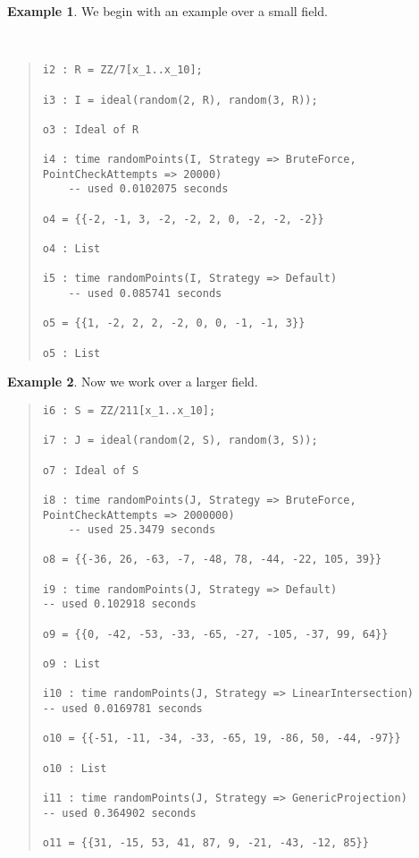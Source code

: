 \documentclass[11pt]{amsart}
\theoremstyle{definition}
\newtheorem{example}{Example}[section]
\begin{document}
    \begin{example}
        We begin with an example over a small field.
    {{\small\color{blue}
    ~~
    \begin{quote}
\begin{verbatim}
i2 : R = ZZ/7[x_1..x_10];

i3 : I = ideal(random(2, R), random(3, R));

o3 : Ideal of R

i4 : time randomPoints(I, Strategy => BruteForce, PointCheckAttempts => 20000)
    -- used 0.0102075 seconds

o4 = {{-2, -1, 3, -2, -2, 2, 0, -2, -2, -2}}

o4 : List

i5 : time randomPoints(I, Strategy => Default)
    -- used 0.085741 seconds

o5 = {{1, -2, 2, 2, -2, 0, 0, -1, -1, 3}}

o5 : List
    \end{verbatim}
\end{quote}\vspace{-1em}
    }}
    \end{example}    

\begin{example}
    Now we work over a larger field.
    {{\small\color{blue}
    \begin{quote}
\begin{verbatim}
i6 : S = ZZ/211[x_1..x_10];

i7 : J = ideal(random(2, S), random(3, S));

o7 : Ideal of S

i8 : time randomPoints(J, Strategy => BruteForce, PointCheckAttempts => 2000000)
    -- used 25.3479 seconds

o8 = {{-36, 26, -63, -7, -48, 78, -44, -22, 105, 39}}

i9 : time randomPoints(J, Strategy => Default)
-- used 0.102918 seconds

o9 = {{0, -42, -53, -33, -65, -27, -105, -37, 99, 64}}

o9 : List

i10 : time randomPoints(J, Strategy => LinearIntersection)
-- used 0.0169781 seconds

o10 = {{-51, -11, -34, -33, -65, 19, -86, 50, -44, -97}}

o10 : List

i11 : time randomPoints(J, Strategy => GenericProjection)
-- used 0.364902 seconds

o11 = {{31, -15, 53, 41, 87, 9, -21, -43, -12, 85}}      
    \end{verbatim}
\end{quote}\vspace{-1em}
        }}
    \end{example}
\end{document}
